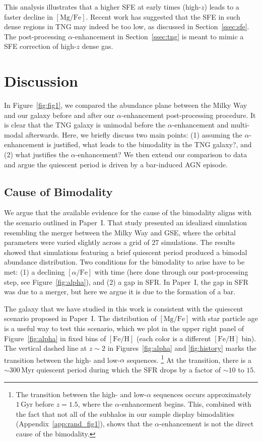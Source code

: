 \documentclass[twocolumn,linenumbers]{aastex631}
\newcommand{\Gyr}{\ensuremath{\textrm{Gyr}}}
\newcommand{\Myr}{\ensuremath{\textrm{Myr}}}
\newcommand{\FeH}{\ensuremath{[\textrm{Fe}/\textrm{H}]}}
\newcommand{\MgFe}{\ensuremath{[\textrm{Mg}/\textrm{Fe}]}}
\newcommand{\alphaFe}{\ensuremath{[\alpha/\textrm{Fe}]}}
\begin{document}
This analysis illustrates that a higher SFE at early times (high-$z$) leads to a faster decline in \MgFe{}. Recent work has suggested that the SFE in such dense regions in TNG may indeed be too low, as discussed in Section~\ref{ssec:sfe}. The post-processing $\alpha$-enhancement in Section~\ref{ssec:tng} is meant to mimic a SFE correction of high-$z$ dense gas.

\section{Discussion}\label{sec:disc}
In Figure~\ref{fig:fig1}, we compared the abundance plane between the Milky Way and our galaxy before and after our $\alpha$-enhancement post-processing procedure. It is clear that the TNG galaxy is unimodal before the $\alpha$-enhancement and multi-modal afterwards. Here, we briefly discuss two main points: (1) assuming the $\alpha$-enhancement is justified, what leads to the bimodality in the TNG galaxy?, and (2) what justifies the $\alpha$-enhancement? We then extend our comparison to data and argue the quiescent period is driven by a bar-induced AGN episode.

\subsection{Cause of Bimodality}\label{ssec:bim_cause}
We argue that the available evidence for the cause of the bimodality aligns with the scenario outlined in Paper~I. That study presented an idealized simulation resembling the merger between the Milky Way and GSE, where the orbital parameters were varied slightly across a grid of 27 simulations. The results showed that simulations featuring a brief quiescent period produced a bimodal abundance distribution. Two conditions for the bimodality to arise have to be met: (1) a declining \alphaFe{} with time (here done through our post-processing step, see Figure~\ref{fig:alpha}), and (2) a gap in SFR. In Paper~I, the gap in SFR was due to a merger, but here we argue it is due to the formation of a bar.

The galaxy that we have studied in this work is consistent with the quiescent scenario proposed in Paper~I. The distribution of \MgFe{} with star particle age is a useful way to test this scenario, which we plot in the upper right panel of Figure~\ref{fig:alpha} in fixed bins of \FeH{} (each color is a different \FeH{} bin). The vertical dashed line at $z\sim2$ in Figures~\ref{fig:alpha} and \ref{fig:history} marks the transition between the high- and low-$\alpha$ sequences.
\footnote{The transition between the high- and low-$\alpha$ sequences occurs approximately $1\,\Gyr$ before $z=1.5$, where the $\alpha$-enhancement begins. This, combined with the fact that not all of the subhalos in our sample display bimodalities (Appendix~\ref{app:rand_fig1}), shows that the $\alpha$-enhancement is not the direct cause of the bimodality.} At the transition, there is a $\sim300\,\Myr$ quiescent period during which the SFR drops by a factor of $\sim10$ to $15$.
\end{document}
